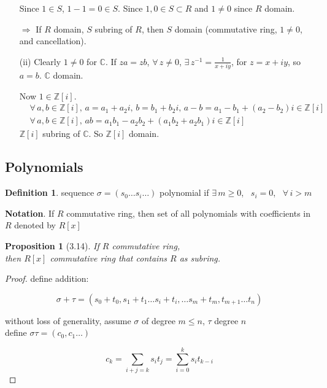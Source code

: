 \documentclass[twoside,landscape]{amsart}
\theoremstyle{plain}
\newtheorem{proposition}{Proposition}
\theoremstyle{definition}
\newtheorem{definition}{Definition}
\theoremstyle{remark}
\begin{document}
\begin{multicols*}{2}
\begin{enumerate}
  Since $1\in S$, $1-1=0 \in S$.  Since $1,0 \in S \subset R$ and $1\neq 0$ since $R$ domain.

  $\Longrightarrow $ If $R$ domain, $S$ subring of $R$, then $S$ domain (commutative ring, $1\neq 0$, and cancellation).  
\item[(ii)]
  Clearly $1\neq 0$ for $\mathbb{C}$.  If $za=zb$, $\forall \, z \neq 0$, $\exists \, z^{-1} = \frac{1}{ x+iy}$, for $z = x+iy$, so $a=b$.  $\mathbb{C}$ domain.

  Now $1\in \mathbb{Z}[i]$.
  \[
\begin{aligned}
  & \forall \, a,b \in \mathbb{Z}[i], \,  a = a_1 + a_2 i, \, b = b_1 + b_2 i , \, a-b = a_1 - b_1 + (a_2 - b_2) i \in \mathbb{Z}[i] \\ 
  &  \forall \, a,b \in \mathbb{Z}[i], \, ab = a_1 b_1 -a_2b_2 + (a_1b_2 + a_2 b_1) i \in \mathbb{Z}[i]  
  \end{aligned}
\]
$\mathbb{Z}[i]$ subring of $\mathbb{C}$.  So $\mathbb{Z}[i]$ domain.  
  \end{enumerate}


\subsection{ Polynomials }


\begin{definition}
  sequence $\sigma = (s_0 \dots s_i \dots )$ polynomial if $\exists \,  m \geq 0$, \, $s_i =0$, \, $\forall \, i > m$
\end{definition}


\textbf{Notation}.  If $R$ commutative ring, then set of all polynomials with coefficients in $R$ denoted by $R[x]$

\begin{proposition}[3.14] 
  If $R$ commutative ring, \\
then $R[x]$ commutative ring that contains $R$ as subring.
\end{proposition}

\begin{proof} 
define addition: 

\[
\sigma + \tau = (s_0 + t_0 , s_1 + t_1  \dots s_i + t_i , \dots s_m + t_m , t_{m+1} \dots t_n )
\]

without loss of generality, assume $\sigma $ of degree $m \leq n$, $\tau$ degree $n$  \\

define $\sigma \tau = (c_0, c_1 \dots )$ 

\[
c_k = \sum_{i+j =k } s_i t_j = \sum_{i=0}^k s_i t_{k-i}
\]


\end{proof}
\end{multicols*}
\end{document}
